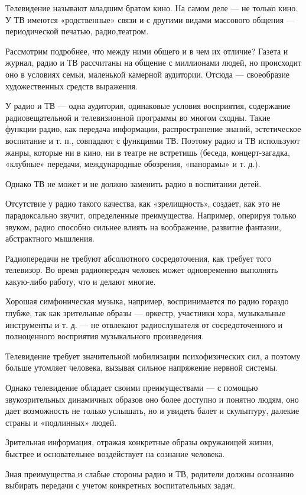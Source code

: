 \documentclass[12pt, a4paper, openany]{book}
\begin{document}
Телевидение называют младшим братом кино. На самом деле — не только кино. У ТВ имеются «родственные» связи и с другими видами массового общения — периодической печатью, радио,театром. 

Рассмотрим подробнее, что между ними общего и в чем их отличие? Газета и журнал, радио и ТВ рассчитаны на общение с миллионами людей, но происходит оно в условиях семьи, маленькой камерной аудитории. Отсюда — своеобразие художественных средств выражения. 

У радио и ТВ — одна аудитория, одинаковые условия восприятия, содержание радиовещательной и телевизионной программы во многом сходны. Такие функции радио, как передача информации, распространение знаний, эстетическое воспитание и т. п., совпадают с функциями ТВ. Поэтому радио и ТВ используют жанры, которые ни в кино, ни в театре не встретишь (беседа, концерт-загадка, «клубные» передачи, международные обозрения, «панорамы» и т. д.). 

Однако ТВ не может и не должно заменить радио в воспитании детей. 

Отсутствие у радио такого качества, как «зрелищность», создает, как это не парадоксально звучит, определенные преимущества. Например, оперируя только звуком, радио способно сильнее влиять на воображение, развитие фантазии, абстрактного мышления. 

Радиопередачи не требуют абсолютного сосредоточения, как требует того телевизор. Во время радиопередач человек может одновременно выполнять какую-либо работу, что и делают многие. 

Хорошая симфоническая музыка, например, воспринимается по радио гораздо глубже, так как зрительные образы — оркестр, участники хора, музыкальные инструменты и т. д. — не отвлекают радиослушателя от сосредоточенного и полноценного восприятия музыкального произведения. 

Телевидение требует значительной мобилизации психофизических сил, а поэтому больше утомляет человека, вызывая сильное напряжение нервной системы. 

Однако телевидение обладает своими преимуществами — с помощью звукозрительных динамичных образов оно более доступно и понятно людям, оно дает возможность не только услышать, но и увидеть балет и скульптуру, далекие страны и «подлинных» людей. 

Зрительная информация, отражая конкретные образы окружающей жизни, быстрее и основательнее воздействует на сознание человека. 

Зная преимущества и слабые стороны радио и ТВ, родители должны осознанно выбирать передачи с учетом конкретных воспитательных задач. 
\end{document}
